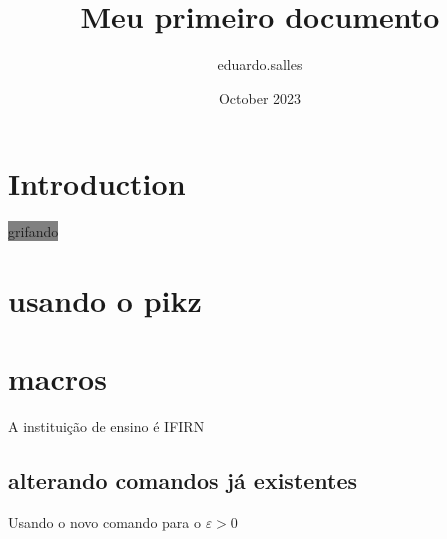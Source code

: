 \documentclass{article}
\title{Meu primeiro documento}
\author{eduardo.salles}
\date{October 2023}
\begin{document}
\pagecolor{yellow! 10}
\newcommand{\institution}{IFIRN}
\renewcommand{\epsilon}{\varepsilon}
\maketitle

\section{Introduction}

\textcolor{red}{\lipsum[1]}

\bigbreak

\colorbox{gray}{grifando}

\newpage

\section{usando o pikz}


\newpage

\section{macros}

A instituição de ensino é {\institution}

\subsection{alterando comandos já existentes}

Usando o novo comando para o $\epsilon > 0$
\end{document}
